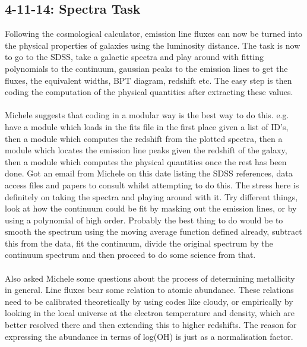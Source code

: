 \documentclass{literature}
\begin{document}
\subsection{4-11-14: Spectra Task}\label{Meeting_3}
Following the cosmological calculator, emission line fluxes can now be turned into the physical properties of galaxies using the luminosity distance. The task is now to go to the SDSS, take a galactic spectra and play around with fitting polynomials to the continuum, gaussian peaks to the emission lines to get the fluxes, the equivalent widths, BPT diagram, redshift etc. The easy step is then coding the computation of the physical quantities after extracting these values. \\\\
\noindent
Michele suggests that coding in a modular way is the best way to do this. e.g. have a module which loads in the fits file in the first place given a list of ID's, then a module which computes the redshift from the plotted spectra, then a module which locates the emission line peaks given the redshift of the galaxy, then a module which computes the physical quantities once the rest has been done. Got an email from Michele on this date listing the SDSS references, data access files and papers to consult whilst attempting to do this. The stress here is definitely on taking the spectra and playing around with it. Try different things, look at how the continuum could be fit by masking out the emission lines, or by using a polynomial of high order. Probably the best thing to do would be to smooth the spectrum using the moving average function defined already, subtract this from the data, fit the continuum, divide the original spectrum by the continuum spectrum and then proceed to do some science from that. \\\\
Also asked Michele some questions about the process of determining metallicity in general. Line fluxes bear some relation to atomic abundance. These relations need to be calibrated theoretically by using codes like cloudy, or empirically by looking in the local universe at the electron temperature and density, which are better resolved there and then extending this to higher redshifts. The reason for expressing the abundance in terms of log(OH) is just as a normalisation factor. 
\end{document}
